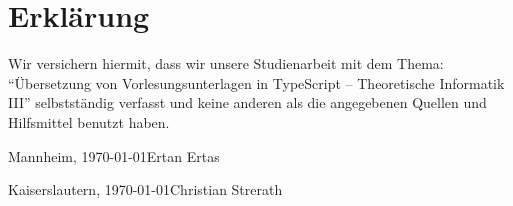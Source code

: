 
\section*{Erklärung}

Wir versichern hiermit, dass wir unsere Studienarbeit mit dem Thema: \enquote{Übersetzung von Vorlesungsunterlagen in TypeScript -- Theoretische Informatik III} selbstständig verfasst und keine anderen als die angegebenen Quellen und Hilfsmittel benutzt haben.

\vspace{3cm}
\noindent Mannheim, \today \hfill Ertan Ertas

\vspace{2cm}
\noindent Kaiserslautern, \today \hfill Christian Strerath